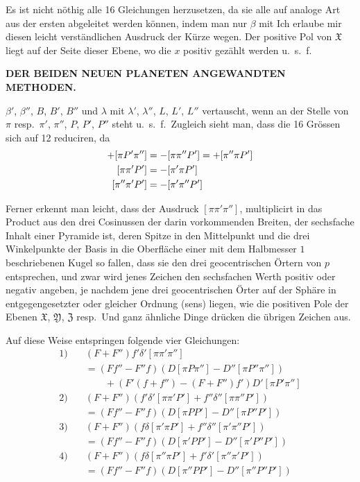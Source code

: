 Es ist nicht nöthig alle 16 Gleichungen herzusetzen, da sie alle auf analoge Art aus der ersten abgeleitet werden können, indem man nur $\beta$ mit
\expandafter\def\csname HistoricalNoteText9\endcsname{Ich erlaube mir diesen leicht verständlichen Ausdruck der Kürze wegen. Der positive Pol von $\mathfrak{X}$ liegt auf der Seite dieser Ebene, wo die $x$ positiv gezählt werden u.\ s.\ f.}%
\clearpage
\thispagestyle{empty}
\noindent{}%
\makebox[12mm][l]{}%
\parbox[t]{\dimexpr\linewidth-24mm\relax}{\centering\fontsize{7.4}{9.2}\selectfont\bfseries DER BEIDEN NEUEN PLANETEN ANGEWANDTEN METHODEN.\par}%
\par\nobreak\medskip
\noindent $\beta'$, $\beta''$, $B$, $B'$, $B''$ und $\lambda$ mit $\lambda'$, $\lambda''$, $L$, $L'$, $L''$ vertauscht, wenn an der Stelle von $\pi$ resp.\ $\pi'$, $\pi''$, $P$, $P'$, $P''$ steht u.\ s.\ f.\ Zugleich sieht man, dass die 16 Grössen sich auf 12 reduciren, da
\[
\begin{aligned}
+[\pi P'\pi'']&=-[\pi\pi''P']=+[\pi''\pi P']\\\relax
[\pi\pi'P']&=-[\pi'\pi P']\\\relax
[\pi''\pi'P']&=-[\pi'\pi''P']
\end{aligned}
\]

Ferner erkennt man leicht, dass der Ausdruck $[\pi\pi'\pi'']$, multiplicirt in das Product aus den drei Cosinussen der darin vorkommenden Breiten, der sechsfache Inhalt einer Pyramide ist, deren Spitze in den Mittelpunkt und die drei Winkelpunkte der Basis in die Oberfläche einer mit dem Halbmesser $1$ beschriebenen Kugel so fallen, dass sie den drei geocentrischen Örtern von $p$ entsprechen, und zwar wird jenes Zeichen den sechsfachen Werth positiv oder negativ angeben, je nachdem jene drei geocentrischen Örter auf der Sphäre in entgegengesetzter oder gleicher Ordnung (sens) liegen, wie die positiven Pole der Ebenen $\mathfrak{X}$, $\mathfrak{Y}$, $\mathfrak{Z}$ resp.\ Und ganz ähnliche Dinge drücken die übrigen Zeichen aus.

Auf diese Weise entspringen folgende vier Gleichungen:
\[
\begin{aligned}
1)\quad &(F+F'')f'\delta'[\pi\pi'\pi'']\\
&=(Ff''-F''f)(D[\pi P\pi'']-D''[\pi P''\pi''])\\
&\qquad+(F'(f+f'')-(F+F'')f')D'[\pi P'\pi'']\\
2)\quad &(F+F'')(f'\delta'[\pi\pi'P']+f''\delta''[\pi\pi''P'])\\
&=(Ff''-F''f)(D[\pi PP']-D''[\pi P''P'])\\
3)\quad &(F+F'')(f\delta[\pi'\pi P']+f''\delta''[\pi'\pi''P'])\\
&=(Ff''-F''f)(D[\pi'PP']-D''[\pi'P''P'])\\
4)\quad &(F+F'')(f\delta[\pi''\pi P']+f'\delta'[\pi''\pi'P'])\\
&=(Ff''-F''f)(D[\pi''PP']-D''[\pi''P''P'])
\end{aligned}
\]

